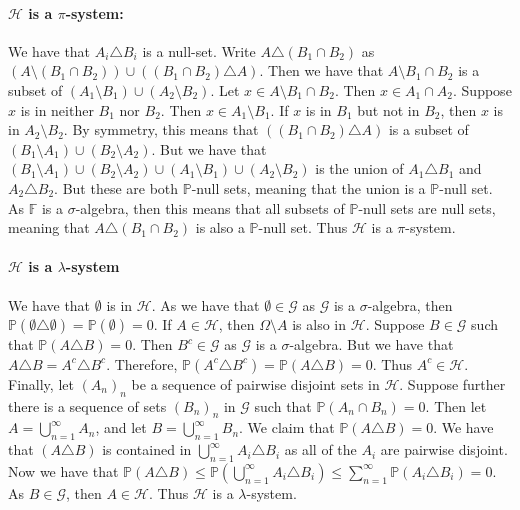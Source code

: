 \documentclass{article}
\theoremstyle{definition}
\numberwithin{theorem}{section}
\numberwithin{equation}{section}
\begin{document}
\paragraph{$\mathcal{H}$ is a $\pi$-system:}
We have that $A_i \triangle B_i$ is a null-set. Write $A \triangle (B_1 \cap B_2)$ as $\left(A \setminus (B_1 \cap B_2)\right) \cup \left((B_1 \cap B_2) \triangle A\right)$. Then we have that $A \setminus B_1 \cap B_2$ is a subset of $(A_1 \setminus B_1) \cup (A_2 \setminus B_2)$. Let $x \in A \setminus B_1 \cap B_2$. Then $x \in A_1 \cap A_2$. Suppose $x$ is in neither $B_1$ nor $B_2$. Then $x \in A_1 \setminus B_1$. If $x$ is in $B_1$ but not in $B_2$, then $x$ is in $A_2 \setminus B_2$. By symmetry, this means that $\left((B_1 \cap B_2) \triangle A\right)$ is a subset of $(B_1 \setminus A_1) \cup (B_2 \setminus A_2)$. But we have that $(B_1 \setminus A_1) \cup (B_2 \setminus A_2) \cup (A_1 \setminus B_1) \cup (A_2 \setminus B_2)$ is the union of $A_1 \triangle B_1$ and $A_2 \triangle B_2$. But these are both $\mathbb{P}$-null sets, meaning that the union is a $\mathbb{P}$-null set. As $\mathbb{F}$ is a $\sigma$-algebra, then this means that all subsets of $\mathbb{P}$-null sets are null sets, meaning that $A \triangle (B_1 \cap B_2)$ is also a $\mathbb{P}$-null set. Thus $\mathcal{H}$ is a $\pi$-system.

\paragraph{$\mathcal{H}$ is a $\lambda$-system}
We have that $\emptyset$ is in $\mathcal{H}$. As we have that $\emptyset \in \mathcal{G}$ as $\mathcal{G}$ is a $\sigma$-algebra, then $\mathbb{P}(\emptyset \triangle \emptyset) = \mathbb{P}(\emptyset) = 0$. If $A \in \mathcal{H}$, then $\Omega \setminus A$ is also in $\mathcal{H}$. Suppose $B \in \mathcal{G}$ such that $\mathbb{P}(A \triangle B) = 0$. Then $B^c \in \mathcal{G}$ as $\mathcal{G}$ is a $\sigma$-algebra. But we have that $A \triangle B = A^c \triangle B^c$. Therefore, $\mathbb{P}(A^c \triangle B^c) = \mathbb{P}(A \triangle B) = 0$. Thus $A^c \in \mathcal{H}$. Finally, let $(A_n)_n$ be a sequence of pairwise disjoint sets in $\mathcal{H}$. Suppose further there is a sequence of sets $(B_n)_n$ in $\mathcal{G}$ such that $\mathbb{P}(A_n \cap B_n) = 0$. Then let $A = \bigcup_{n = 1}^\infty A_n$, and let $B = \bigcup_{n = 1}^\infty B_n$. We claim that $\mathbb{P}(A \triangle B) = 0$. We have that $(A \triangle B)$ is contained in $\bigcup_{n = 1}^\infty A_i \triangle B_i$ as all of the $A_i$ are pairwise disjoint. Now we have that $\mathbb{P}(A \triangle B) \leq \mathbb{P}(\bigcup_{n = 1}^\infty A_i \triangle B_i) \leq \sum_{n = 1}^{\infty}\mathbb{P}(A_i \triangle B_i) = 0$. As $B \in \mathcal{G}$, then $A \in \mathcal{H}$. Thus $\mathcal{H}$ is a $\lambda$-system.
\end{document}
